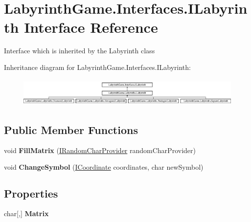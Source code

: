 \hypertarget{interface_labyrinth_game_1_1_interfaces_1_1_i_labyrinth}{\section{Labyrinth\+Game.\+Interfaces.\+I\+Labyrinth Interface Reference}
\label{interface_labyrinth_game_1_1_interfaces_1_1_i_labyrinth}
}


Interface which is inherited by the Labyrinth class  


Inheritance diagram for Labyrinth\+Game.\+Interfaces.\+I\+Labyrinth\+:\begin{figure}[H]
\begin{center}
\leavevmode
\includegraphics[height=1.473684cm]{interface_labyrinth_game_1_1_interfaces_1_1_i_labyrinth}
\end{center}
\end{figure}
\subsection*{Public Member Functions}
\begin{DoxyCompactItemize}
\item 
\hypertarget{interface_labyrinth_game_1_1_interfaces_1_1_i_labyrinth_a949a13949711b621a487d3efcd37b0eb}{void {\bfseries Fill\+Matrix} (\hyperlink{interface_labyrinth_game_1_1_interfaces_1_1_i_random_char_provider}{I\+Random\+Char\+Provider} random\+Char\+Provider)}\label{interface_labyrinth_game_1_1_interfaces_1_1_i_labyrinth_a949a13949711b621a487d3efcd37b0eb}

\item 
\hypertarget{interface_labyrinth_game_1_1_interfaces_1_1_i_labyrinth_a921c8376d2a59e784f1e95b355722b0a}{void {\bfseries Change\+Symbol} (\hyperlink{interface_labyrinth_game_1_1_interfaces_1_1_i_coordinate}{I\+Coordinate} coordinates, char new\+Symbol)}\label{interface_labyrinth_game_1_1_interfaces_1_1_i_labyrinth_a921c8376d2a59e784f1e95b355722b0a}

\end{DoxyCompactItemize}
\subsection*{Properties}
\begin{DoxyCompactItemize}
\item 
\hypertarget{interface_labyrinth_game_1_1_interfaces_1_1_i_labyrinth_af48030cf8898560b662ac445edc11acd}{char\mbox{[},\mbox{]} {\bfseries Matrix}}\label{interface_labyrinth_game_1_1_interfaces_1_1_i_labyrinth_af48030cf8898560b662ac445edc11acd}

\end{DoxyCompactItemize}


